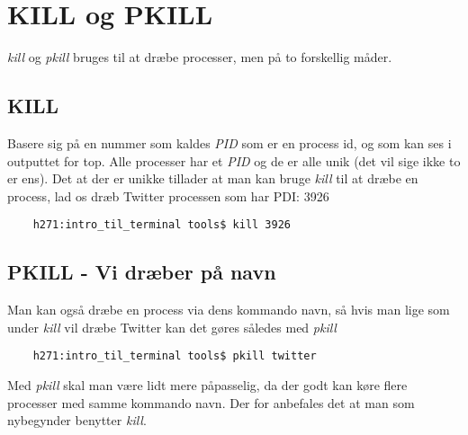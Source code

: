 \section{KILL og PKILL}
\textit{kill} og \textit{pkill} bruges til at dræbe processer, men på to forskellig måder.
\subsection*{KILL}
Basere sig på en nummer som kaldes \textit{PID} som er en process id, og som kan ses i outputtet for top. Alle processer har et \textit{PID} og de er alle unik (det vil sige ikke to er ens). Det at der er unikke tillader at man kan bruge \textit{kill} til at dræbe en process, lad os dræb Twitter processen som har PDI: 3926 
\begin{lstlisting}
	h271:intro_til_terminal tools$ kill 3926
\end{lstlisting}

\subsection*{PKILL - Vi dræber på navn}
Man kan også dræbe en process via dens kommando navn, så hvis man lige som under \textit{kill} vil dræbe Twitter kan det gøres således med \textit{pkill}
\begin{lstlisting}
	h271:intro_til_terminal tools$ pkill twitter
\end{lstlisting}
Med \textit{pkill} skal man være lidt mere påpasselig, da der godt kan køre flere processer med samme kommando navn. Der for anbefales det at man som nybegynder benytter \textit{kill}.

